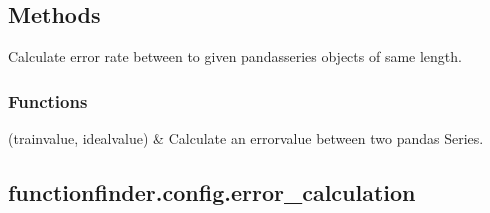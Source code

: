 \documentclass[letterpaper,10pt,english]{sphinxmanual}
\begin{document}
\subsection{Methods}
\label{\detokenize{_autosummary/functionfinder.config:methods}}\begin{description}
\sphinxAtStartPar
Calculate error rate between to given pandas\sphinxhyphen{}series objects of same length.

\end{description}
\subsubsection*{Functions}


\begin{savenotes}\sphinxattablestart
\sphinxthistablewithglobalstyle
\sphinxthistablewithnovlinesstyle
\centering
\begin{tabulary}{\linewidth}[t]{}
\sphinxtoprule
\sphinxtableatstartofbodyhook
\sphinxAtStartPar
{\hyperref[\detokenize{_autosummary/functionfinder.config.error_calculation:functionfinder.config.error_calculation}]{}}(trainvalue, idealvalue)
&
\sphinxAtStartPar
Calculate an error\sphinxhyphen{}value between two pandas Series.
\\
\sphinxbottomrule
\end{tabulary}
\sphinxtableafterendhook\par
\sphinxattableend\end{savenotes}

\sphinxstepscope


\subsection{functionfinder.config.error\_calculation}
\label{\detokenize{_autosummary/functionfinder.config.error_calculation:functionfinder-config-error-calculation}}\label{\detokenize{_autosummary/functionfinder.config.error_calculation::doc}}
\end{document}
